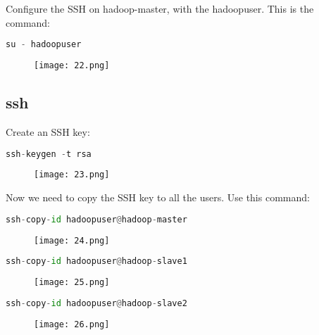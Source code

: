 \documentclass[onecolumn]{article}
\begin{document}
Configure the SSH on hadoop-master, with the hadoopuser. This is the command:

\begin{lstlisting}[language=Python, caption= a ]
su - hadoopuser
\end{lstlisting}

\begin{figure}[ht!]
\centering
\texttt{[image: 22.png]}
\caption{\label{}}
\end{figure}

\subsection{ssh}

Create an SSH key:

\begin{lstlisting}[language=Python, caption= a ]
ssh-keygen -t rsa
\end{lstlisting}

\begin{figure}[ht!]
\centering
\texttt{[image: 23.png]}
\caption{\label{}}
\end{figure}

Now we need to copy the SSH key to all the users. Use this command:

\begin{lstlisting}[language=Python, caption= a ]
ssh-copy-id hadoopuser@hadoop-master
\end{lstlisting}

\begin{figure}[ht!]
\centering
\texttt{[image: 24.png]}
\caption{\label{}}
\end{figure}

\begin{lstlisting}[language=Python, caption= a ]
ssh-copy-id hadoopuser@hadoop-slave1
\end{lstlisting}

\begin{figure}[ht!]
\centering
\texttt{[image: 25.png]}
\caption{\label{}}
\end{figure}

\begin{lstlisting}[language=Python, caption= a ]
ssh-copy-id hadoopuser@hadoop-slave2
\end{lstlisting}

\begin{figure}[ht!]
\centering
\texttt{[image: 26.png]}
\caption{\label{}}
\end{figure}
\end{document}

